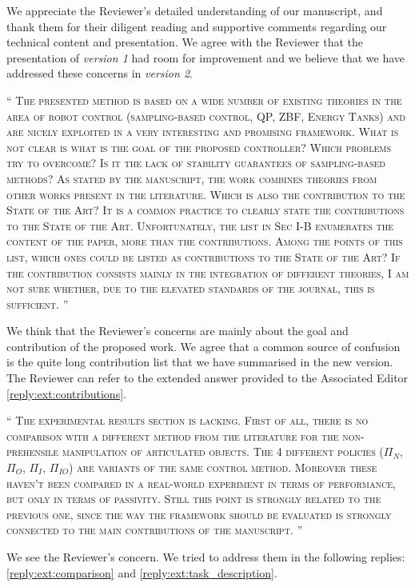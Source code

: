 \documentclass[10pt]{article}
\newcommand{\referee}[1]{\;
  \begin{minipage}[t]{.95\textwidth}
    ``{\small\color{red} \textsc{#1}}''
  \end{minipage}\medskip
  }
\newcommand{\version}[1]{\textit{version #1}}
\begin{document}
\begin{enumerate}[label={[R7:\,\arabic{enumi}]}]
We appreciate the Reviewer's detailed understanding of our manuscript, and thank them for their diligent reading and supportive comments regarding our technical content and presentation. We agree with the Reviewer that the presentation of \version{1} had room for improvement and we believe that we have addressed these concerns in \version{2}.

\item\label{reply:R7:1} 
\referee{The presented method is based on a wide number of existing theories in the area of robot control (sampling-based control, QP, ZBF, Energy Tanks) and are nicely exploited in a very interesting and promising framework. What is not clear is what is the goal of the proposed
controller? Which problems try to overcome? Is it the lack of stability guarantees of sampling-based methods? As stated by the manuscript, the work combines theories from other works present in the literature. Which is also the contribution to the State of the Art? It is a common practice to clearly state the contributions to the State of the Art. 
Unfortunately, the list in Sec I-B enumerates the content of the paper, more than the contributions. Among the points of this list, which ones could be listed as contributions to the State of the Art? If the contribution consists mainly in the integration of different theories,
I am not sure whether, due to the elevated standards of the journal, this is sufficient.
}

We think that the Reviewer’s concerns are mainly about the goal and contribution of the proposed work. We agree that a common source of confusion is the quite long contribution list that we have summarised in the new version. The Reviewer can refer to the extended answer provided to the Associated Editor \ref{reply:ext:contributions}.


\item\label{reply:R7:2} 
\referee{The experimental results section is lacking. First of all, there is no comparison with a different method from the literature for the non-prehensile manipulation of articulated objects. The 4 different policies ($\Pi_{N}$, $\Pi_{O}$, $\Pi_{I}$, $\Pi_{IO}$) are variants of the same control method. Moreover these haven't been compared in a real-world experiment in terms of performance, but only in terms of passivity. Still this point is strongly related to the previous one, since the way the
framework should be evaluated is strongly connected to the main contributions of the manuscript.  
}

We see the Reviewer's concern. We tried to address them in the following replies: \ref{reply:ext:comparison} and \ref{reply:ext:task_description}.



\end{enumerate}
\end{document}
